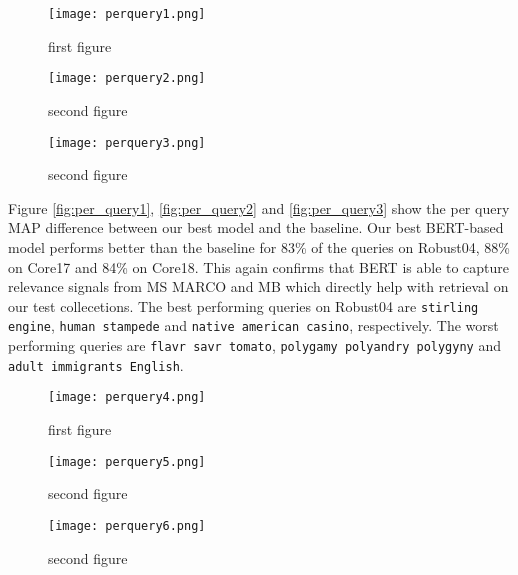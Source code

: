\begin{figure}
	\centering
    \begin{minipage}{0.45\textwidth}
        \centering
        \texttt{[image: perquery1.png]} %
        \caption{first figure}
    \end{minipage}\hfill
    \begin{minipage}{0.45\textwidth}
        \centering
        \texttt{[image: perquery2.png]} %
        \caption{second figure}
    \end{minipage}\hfill
    \begin{minipage}{0.45\textwidth}
        \centering
        \texttt{[image: perquery3.png]} %
        \caption{second figure}
    \end{minipage}
\end{figure}


Figure \ref{fig:per_query1}, \ref{fig:per_query2} and \ref{fig:per_query3} show the per query MAP difference between our best model and the baseline.
Our best BERT-based model performs better than the baseline for 83\% of the queries on Robust04, 88\% on Core17 and 84\% on Core18.
This again confirms that BERT is able to capture relevance signals from MS MARCO and MB which directly help with retrieval on our test collecetions.
The best performing queries on Robust04 are \texttt{stirling engine}, \texttt{human stampede} and \texttt{native american casino}, respectively.
The worst performing queries are \texttt{flavr savr tomato}, \texttt{polygamy polyandry polygyny} and \texttt{adult immigrants English}.

\begin{figure}
	\centering
    \begin{minipage}{0.45\textwidth}
        \centering
        \texttt{[image: perquery4.png]} %
        \caption{first figure}
    \end{minipage}\hfill
    \begin{minipage}{0.45\textwidth}
        \centering
        \texttt{[image: perquery5.png]} %
        \caption{second figure}
    \end{minipage}\hfill
    \begin{minipage}{0.45\textwidth}
        \centering
        \texttt{[image: perquery6.png]} %
        \caption{second figure}
    \end{minipage}
\end{figure}

